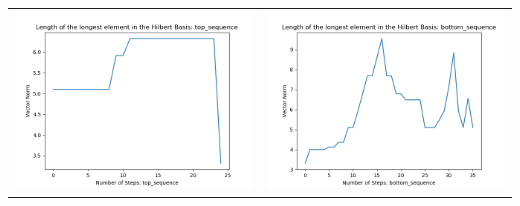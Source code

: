 \documentclass[10pt]{article}
\begin{document}
\begin{tabular}{c|c}
\begin{minipage}{.45\textwidth}
\includegraphics[width=\textwidth]{"DATA/5d/6 generators 2 bound H/top_sequence LENGTH"}
\end{minipage} &
\begin{minipage}{.45\textwidth}
\includegraphics[width=\textwidth]{"DATA/5d/6 generators 2 bound H bottomup/bottom_sequence LENGTH"}
\end{minipage}
\end{tabular}
\end{document}
